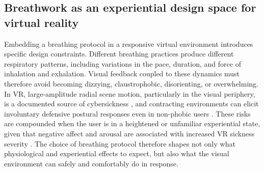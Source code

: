 \subsection{Breathwork as an experiential design space for virtual reality}

Embedding a breathing protocol in a responsive virtual environment introduces specific design constraints. Different breathing practices produce different respiratory patterns, including variations in the pace, duration, and force of inhalation and exhalation. Visual feedback coupled to these dynamics must therefore avoid becoming dizzying, claustrophobic, disorienting, or overwhelming. In VR, large-amplitude radial scene motion, particularly in the visual periphery, is a documented source of cybersickness \citep{Chang2020vrsickness, Poehlmann2021vection}, and contracting environments can elicit involuntary defensive postural responses even in non-phobic users \citep{KodithuwakkuArachchige2022walls}. These risks are compounded when the user is in a heightened or unfamiliar experiential state, given that negative affect and arousal are associated with increased VR sickness severity \citep{Kaufeld2022emotions}. The choice of breathing protocol therefore shapes not only what physiological and experiential effects to expect, but also what the visual environment can safely and comfortably do in response.


